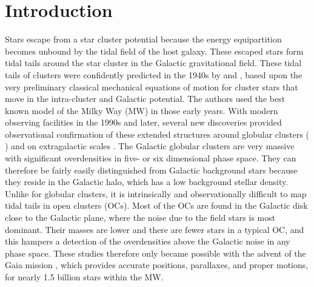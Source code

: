 \documentclass{aa}
\begin{document}
\section{Introduction} \label{sec:introduction}

Stars escape from a star cluster potential because the %
energy equipartition becomes unbound by the tidal field of the host galaxy. These escaped stars form tidal tails around the star cluster in the Galactic gravitational field. These tidal tails of clusters were confidently predicted in the 1940s by \citet{1934HarCi.384....1B} and \citet{1940MNRAS.100..396S}, based upon the very preliminary classical mechanical equations of motion for cluster stars that move in the intra-cluster and Galactic potential. The authors used the best known model of the Milky Way (MW) in those early years.
With modern observing facilities in the 1990s and later, several new discoveries provided observational confirmation of these extended structures around globular clusters ( \citealt{1995AJ....109.2553Grillmair, 1997A&A...320..776Lehmann, kharchenko1997membership, 2001ApJ...548L.165Odenkirchen, 2002AJ....124..349Rockosi, 2006ApJ...637L..29Belokurov, lee2003wide, ibata2019streams}) and on extragalactic scales \citep{2007A&A...473..429Federici}. The Galactic globular clusters are very massive with significant overdensities in five- or six dimensional phase space. They can therefore be fairly easily distinguished from Galactic background stars because they reside in the Galactic halo, which has a low background stellar density. Unlike for globular clusters, it is intrinsically and observationally difficult to map tidal tails in open clusters (OCs). Most of the OCs are found in the Galactic disk close to the Galactic plane, where the noise due to the field stars is most dominant. Their masses are lower and there are fewer stars in a typical OC, and this hampers a detection of the overdensities above the Galactic noise in any phase space. These studies therefore only became possible with the advent of the Gaia mission \citep{2016A&A...595A...1_Gaia_Instrument,2018A&A...616A...1Gaia_DR2_Cit,2021_Gaia_EDR_3,Gaia2023A&A...674A...1G}, which provides accurate positions, parallaxes, and proper motions, for nearly 1.5 billion stars within the MW. 
\end{document}
